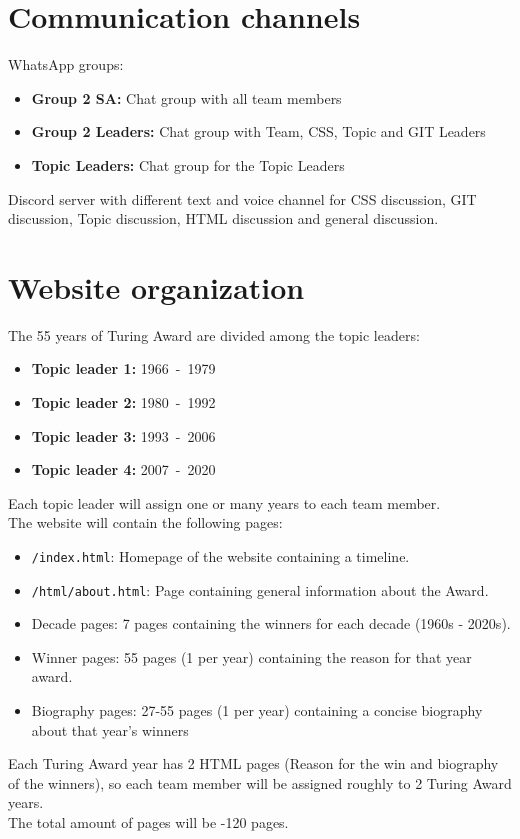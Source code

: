 \documentclass[a4paper,12pt]{article}
\begin{document}
\vspace{2em}
\section{Communication channels}
WhatsApp groups:
\begin{itemize}
 \item \textbf{Group 2 SA:} Chat group with all team members
 \item \textbf{Group 2 Leaders:} Chat group with Team, CSS, Topic and GIT Leaders
 \item \textbf{Topic Leaders:} Chat group for the Topic Leaders
\end{itemize}
Discord server with different text and voice channel for CSS discussion, GIT discussion, Topic discussion, HTML discussion and general discussion.


\newpage

\section{Website organization}

The 55 years of Turing Award are divided among the topic leaders:
\begin{itemize}
 \item \textbf{Topic leader 1:} 1966\ -\ 1979
 \item \textbf{Topic leader 2:} 1980\ -\ 1992
 \item \textbf{Topic leader 3:} 1993\ -\ 2006
 \item \textbf{Topic leader 4:} 2007\ -\ 2020
\end{itemize}
Each topic leader will assign one or many years to each team member.
\\[1em]
The website will contain the following pages:
\begin{itemize}
 \item \texttt{/index.html}: Homepage of the website containing a timeline.
 \item \texttt{/html/about.html}: Page containing general information about the Award.
 \item Decade pages: 7 pages containing the winners for each decade (1960s - 2020s).
 \item Winner pages: 55 pages (1 per year) containing the reason for that year award.
 \item Biography pages: 27-55 pages (1 per year) containing a concise biography about that year's winners
\end{itemize}
Each Turing Award year has 2 HTML pages (Reason for the win and biography of the winners), so each team member will be assigned roughly to 2 Turing Award years.\\
The total amount of pages will be -120 pages.
\end{document}
